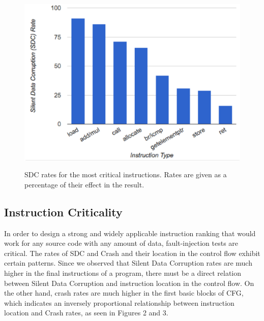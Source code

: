 \begin{figure}[!t]
\begin{center}
\label{fig:plan_10}\includegraphics[scale=0.39]{./figures/sdc_type_2.eps}
\end{center}
\caption{SDC rates for the most critical instructions. Rates are given as a percentage of their effect in the result.}
\label{fig:plan_10}
\end{figure}



\subsection{Instruction Criticality}\label{sec:est_sharing}


In order to design a strong and widely applicable instruction ranking that would work for any source code with any amount of data, fault-injection tests are critical. The rates of SDC and Crash and their location in the control flow exhibit certain patterns. Since we observed that Silent Data Corruption rates are much higher in the final instructions of a program, there must be a direct relation between Silent Data Corruption and instruction location in the control flow. On the other hand, crash rates are much higher in the first basic blocks of CFG, which indicates an inversely proportional relationship between instruction location and Crash rates, as seen in Figures 2 and 3. 

